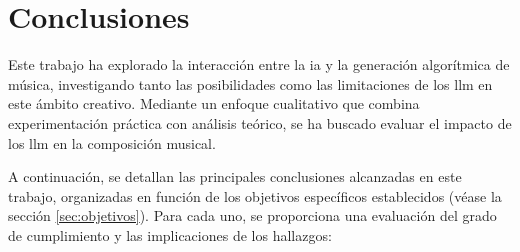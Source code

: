 \chapter{Conclusiones}



Este trabajo ha explorado la interacción entre la \gls{ia} y la generación algorítmica de música, investigando tanto las posibilidades como las limitaciones de los \gls{llm} en este ámbito creativo. Mediante un enfoque cualitativo que combina experimentación práctica con análisis teórico, se ha buscado evaluar el impacto de los \gls{llm} en la composición musical.

A continuación, se detallan las principales conclusiones alcanzadas en este trabajo, organizadas en función de los objetivos específicos establecidos (véase la sección \ref{sec:objetivos}). Para cada uno, se proporciona una evaluación del grado de cumplimiento y las implicaciones de los hallazgos:

